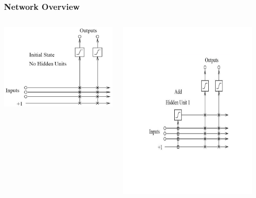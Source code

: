\documentclass[presentation]{beamer}
\begin{document}
\begin{frame}
  \frametitle{Network Overview}
	\begin{columns}
		\begin{column}[t]{0.5\textwidth}
        \includegraphics[scale=0.18]{networkinit.png}
  		\end{column}
		\begin{column}{0.5\textwidth}
        \includegraphics[scale=0.28]{hidden1done.png}
		\end{column}
	\end{columns}
\end{frame}
\end{document}
